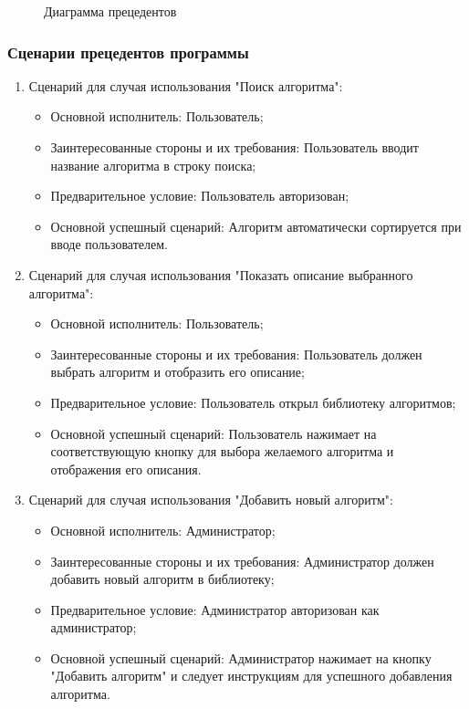 \begin{enumerate}
	
	
	\begin{figure}[ht]
		\caption{Диаграмма прецедентов}
		\label{precend:image}
	\end{figure}
	
	\subsubsection{Сценарии прецедентов программы}
	
	\begin{enumerate}
		\item Сценарий для случая использования "Поиск алгоритма":
		\begin{itemize}
			\item Основной исполнитель: Пользователь;
			\item Заинтересованные стороны и их требования: Пользователь вводит название алгоритма в строку поиска;
			\item Предварительное условие: Пользователь авторизован;
			\item Основной успешный сценарий: Алгоритм автоматически сортируется при вводе пользователем.
		\end{itemize}
		
		\item Сценарий для случая использования "Показать описание выбранного алгоритма":
		\begin{itemize}
			\item Основной исполнитель: Пользователь;
			\item Заинтересованные стороны и их требования: Пользователь должен выбрать алгоритм и отобразить его описание;
			\item Предварительное условие: Пользователь открыл библиотеку алгоритмов;
			\item Основной успешный сценарий: Пользователь нажимает на соответствующую кнопку для выбора желаемого алгоритма и отображения его описания.
		\end{itemize}
		
		\item Сценарий для случая использования "Добавить новый алгоритм":
		\begin{itemize}
			\item Основной исполнитель: Администратор;
			\item Заинтересованные стороны и их требования: Администратор должен добавить новый алгоритм в библиотеку;
			\item Предварительное условие: Администратор авторизован как администратор;
			\item Основной успешный сценарий: Администратор нажимает на кнопку "Добавить алгоритм" и следует инструкциям для успешного добавления алгоритма.
		\end{itemize}
		

\end{enumerate}
\end{enumerate}
